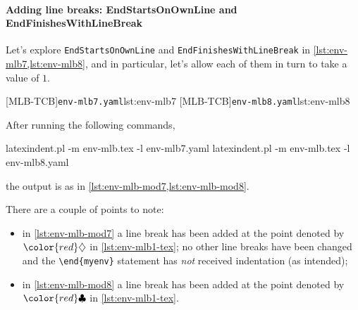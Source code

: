 \documentclass[10pt]{article}
\newcommand{\EndStartsOnOwnLine}{\color{red}\diamondsuit}
\newcommand{\EndFinishesWithLineBreak}{\color{red}\clubsuit}
\begin{document}
 \paragraph{Adding line breaks: EndStartsOnOwnLine and EndFinishesWithLineBreak}
  \begin{example}
  Let's explore \texttt{EndStartsOnOwnLine} and \texttt{EndFinishesWithLineBreak} in
  \cref{lst:env-mlb7,lst:env-mlb8}, and in particular, let's allow each of them in turn
  to take a value of $1$. 

  \begin{cmhtcbraster}
   [MLB-TCB]{\texttt{env-mlb7.yaml}}{lst:env-mlb7}
   [MLB-TCB]{\texttt{env-mlb8.yaml}}{lst:env-mlb8}
  \end{cmhtcbraster}

  After running the following commands, 

  \begin{commandshell}
latexindent.pl -m env-mlb.tex -l env-mlb7.yaml
latexindent.pl -m env-mlb.tex -l env-mlb8.yaml
\end{commandshell}

  the output is as in \cref{lst:env-mlb-mod7,lst:env-mlb-mod8}.

  \begin{cmhtcbraster}[raster columns=3,
    raster left skip=-3.5cm,
    raster right skip=-2cm,
    raster column skip=.06\linewidth]
  \end{cmhtcbraster}

  There are a couple of points to note:
  \begin{itemize}
   \item in \cref{lst:env-mlb-mod7} a line break has been added at the point denoted by
         $\EndStartsOnOwnLine$ in \vref{lst:env-mlb1-tex}; no other line breaks have been
         changed and the \lstinline!\end{myenv}! statement has \emph{not} received
         indentation (as intended);
   \item in \cref{lst:env-mlb-mod8} a line break has been added at the point denoted by
         $\EndFinishesWithLineBreak$ in \vref{lst:env-mlb1-tex}.
  \end{itemize}
  \end{example}
\end{document}
